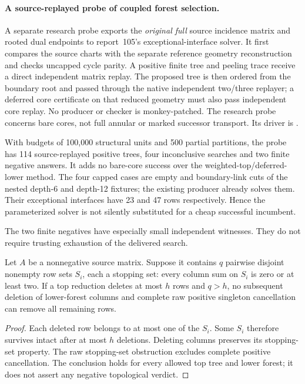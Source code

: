 \paragraph{A source-replayed probe of coupled forest selection.}
A separate research probe exports the
\emph{original full} source incidence matrix and rooted dual endpoints to
report~105's exceptional-interface solver. It first compares the source
charts with the separate reference geometry reconstruction and checks
uncapped cycle parity. A positive finite tree and peeling trace receive
a direct independent matrix replay. The proposed tree is then ordered
from the boundary root and passed through the native independent two/three
replayer; a deferred core certificate on that reduced geometry must also
pass independent core replay. No producer or checker is monkey-patched.
The research probe concerns bare cores, not full annular or marked
successor transport. Its driver is .

With budgets of 100,000 structural units and 500 partial partitions, the
probe has 114 source-replayed positive trees, four inconclusive searches
and two finite negative answers. It adds no bare-core success over the
weighted-top/deferred-lower method. The four capped cases are empty and
boundary-link cuts of the nested depth-6 and depth-12 fixtures; the
existing producer already solves them. Their exceptional interfaces have
23 and 47 rows respectively. Hence the parameterized solver is not
silently substituted for a cheap successful incumbent.

The two finite negatives have especially small independent witnesses.
They do not require trusting exhaustion of the delivered search.
\begin{proposition}
Let $A$ be a nonnegative source matrix. Suppose it contains $q$ pairwise
disjoint nonempty row sets $S_i$, each a stopping set: every column sum
on $S_i$ is zero or at least two. If a top reduction deletes at most $h$
rows and $q>h$, no subsequent deletion of lower-forest columns and complete
raw positive singleton cancellation can remove all remaining rows.
\end{proposition}
\begin{proof}
Each deleted row belongs to at most one of the $S_i$. Some $S_i$ therefore
survives intact after at most $h$ deletions. Deleting columns preserves its
stopping-set property. The raw stopping-set obstruction excludes complete
positive cancellation. The conclusion holds for every allowed top tree
and lower forest; it does not assert any negative topological verdict.
\end{proof}

